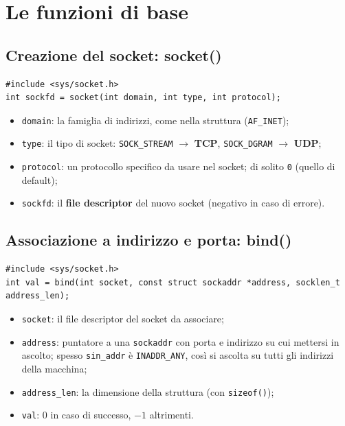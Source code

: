 \section{Le funzioni di base}

\subsection{Creazione del socket: socket()}

\begin{lstlisting}[language={[POSIX]C}]
#include <sys/socket.h>
int sockfd = socket(int domain, int type, int protocol);
\end{lstlisting}

\begin{itemize}
    \item \texttt{domain}: la famiglia di indirizzi, come nella struttura (\texttt{AF\_INET});
    \item \texttt{type}: il tipo di socket: \texttt{SOCK\_STREAM} $\rightarrow$ \textbf{TCP}, \texttt{SOCK\_DGRAM}
          $\rightarrow$ \textbf{UDP};
    \item \texttt{protocol}: un protocollo specifico da usare nel socket; di solito \texttt{0} (quello di default);
    \item \texttt{sockfd}: il \textbf{file descriptor} del nuovo socket (negativo in caso di errore).
\end{itemize}

\subsection{Associazione a indirizzo e porta: bind()}

\begin{lstlisting}[language={[POSIX]C}]
#include <sys/socket.h>
int val = bind(int socket, const struct sockaddr *address, socklen_t address_len);
\end{lstlisting}

\begin{itemize}
    \item \texttt{socket}: il file descriptor del socket da associare;
    \item \texttt{address}: puntatore a una \texttt{sockaddr} con porta e indirizzo su cui mettersi in ascolto;
          spesso \texttt{sin\_addr} è \texttt{INADDR\_ANY}, così si ascolta su tutti gli indirizzi della macchina;
    \item \texttt{address\_len}: la dimensione della struttura (con \texttt{sizeof()});
    \item \texttt{val}: 0 in caso di successo, $-1$ altrimenti.
\end{itemize}

